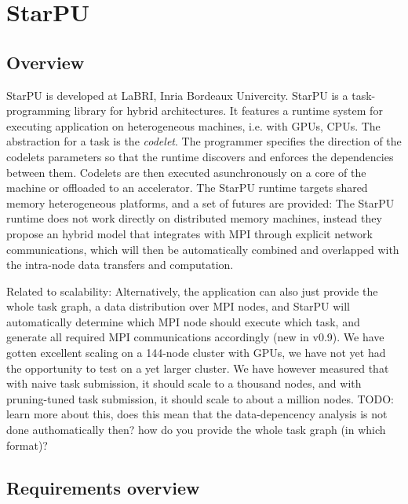 \section{StarPU}

\subsection{Overview}

StarPU is developed at LaBRI, Inria Bordeaux Univercity. 
StarPU is a task-programming library for hybrid architectures. It features a runtime system for executing application on heterogeneous machines, i.e. with GPUs, CPUs. 
The abstraction for a task is the \emph{codelet}. The programmer specifies the direction of the codelets parameters so that the runtime discovers and enforces the dependencies between them.
Codelets are then executed asunchronously on a core of the machine or offloaded to an accelerator. The StarPU runtime targets shared memory heterogeneous platforms, and a set of futures are provided:
The StarPU runtime does not work directly on distributed memory machines, instead they
propose an hybrid model that integrates with MPI through explicit network communications, which will then be automatically combined and overlapped with the intra-node data transfers and computation.

Related to scalability:
Alternatively, the application can also just provide the whole task graph, a data distribution over MPI nodes, and StarPU will automatically determine which MPI node should execute which task, 
and generate all required MPI communications accordingly (new in v0.9). We have gotten excellent scaling on a 144-node cluster with GPUs, we have not yet had the opportunity to test on a yet larger cluster. 
We have however measured that with naive task submission, it should scale to a thousand nodes, and with pruning-tuned task submission, it should scale to about a million nodes. 
TODO: learn more about this, does this mean that the data-depencency analysis is not done authomatically then? how do you provide the whole task graph (in which format)?



\subsection{Requirements overview}

